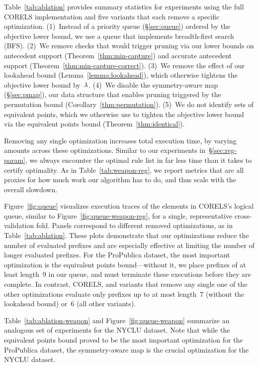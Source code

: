 Table~\ref{tab:ablation} provides summary statistics for experiments using the full
CORELS implementation and five variants that each remove a specific optimization.
%
(1)~Instead of a priority queue (\S\ref{sec:queue}) ordered by the objective lower bound,
we use a queue that implements breadth-first search (BFS).
%
(2)~We remove checks that would trigger pruning via
our lower bounds on antecedent support (Theorem~\ref{thm:min-capture})
and accurate antecedent support (Theorem~\ref{thm:min-capture-correct}).
%
(3)~We remove the effect of our lookahead bound (Lemma~\ref{lemma:lookahead}),
which otherwise tightens the objective lower bound by~${\lambda}$.
%
(4)~We disable the symmetry-aware map (\S\ref{sec:pmap}), our data structure
that enables pruning triggered by the permutation bound (Corollary~\ref{thm:permutation}).
%
(5)~We do not identify sets of equivalent points, which we otherwise use to tighten the
objective lower bound via the equivalent points bound (Theorem~\ref{thm:identical}).

Removing any single optimization increases total execution time,
by varying amounts across these optimizations.
%
Similar to our experiments in~\S\ref{sec:reg-param}, we always encounter the
optimal rule list in far less time than it takes to certify optimality.
%
As in Table~\ref{tab:weapon-reg}, we report metrics that are all proxies
for how much work our algorithm has to do, and thus scale with the overall slowdown.

Figure~\ref{fig:queue} visualizes execution traces of the elements in CORELS's logical queue,
similar to Figure~\ref{fig:queue-weapon-reg},
for a single, representative cross-validation fold.
%
Panels correspond to different removed optimizations, as in Table~\ref{tab:ablation}.
%
These plots demonstrate that our optimizations reduce the number of evaluated prefixes
and are especially effective at limiting the number of longer evaluated prefixes.
%
For the ProPublica dataset, the most important optimization is the equivalent points
bound---without it, we place prefixes of at least length~9 in our queue,
and must terminate these executions before they are complete.
%
In contrast, CORELS, and variants that remove any single one of the other
optimizations evaluate only prefixes up to at most length~7 (without the lookahead bound)
or~6 (all other variants).

Table~\ref{tab:ablation-weapon} and Figure~\ref{fig:queue-weapon} summarize an
analogous set of experiments for the NYCLU dataset.
%
Note that while the equivalent points bound proved to be the most important optimization for the ProPublica dataset,
the symmetry-aware map is the crucial optimization for the NYCLU dataset.

